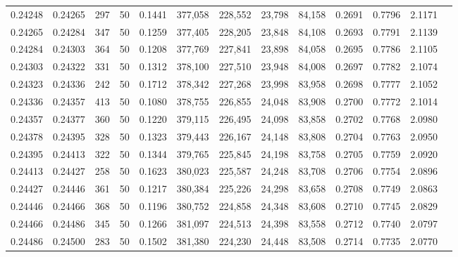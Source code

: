 \begin{tabular}{rrrrrrrrrrrrr}
0.24248 & 0.24265 &   297 &  50 &                                     0.1441 & 377,058 & 228,552 &  23,798 &  84,158 & 0.2691 & 0.7796 & 2.1171 \\
0.24265 & 0.24284 &   347 &  50 &                                     0.1259 & 377,405 & 228,205 &  23,848 &  84,108 & 0.2693 & 0.7791 & 2.1139 \\
0.24284 & 0.24303 &   364 &  50 &                                     0.1208 & 377,769 & 227,841 &  23,898 &  84,058 & 0.2695 & 0.7786 & 2.1105 \\
0.24303 & 0.24322 &   331 &  50 &                                     0.1312 & 378,100 & 227,510 &  23,948 &  84,008 & 0.2697 & 0.7782 & 2.1074 \\
0.24323 & 0.24336 &   242 &  50 &                                     0.1712 & 378,342 & 227,268 &  23,998 &  83,958 & 0.2698 & 0.7777 & 2.1052 \\
0.24336 & 0.24357 &   413 &  50 &                                     0.1080 & 378,755 & 226,855 &  24,048 &  83,908 & 0.2700 & 0.7772 & 2.1014 \\
0.24357 & 0.24377 &   360 &  50 &                                     0.1220 & 379,115 & 226,495 &  24,098 &  83,858 & 0.2702 & 0.7768 & 2.0980 \\
0.24378 & 0.24395 &   328 &  50 &                                     0.1323 & 379,443 & 226,167 &  24,148 &  83,808 & 0.2704 & 0.7763 & 2.0950 \\
0.24395 & 0.24413 &   322 &  50 &                                     0.1344 & 379,765 & 225,845 &  24,198 &  83,758 & 0.2705 & 0.7759 & 2.0920 \\
0.24413 & 0.24427 &   258 &  50 &                                     0.1623 & 380,023 & 225,587 &  24,248 &  83,708 & 0.2706 & 0.7754 & 2.0896 \\
0.24427 & 0.24446 &   361 &  50 &                                     0.1217 & 380,384 & 225,226 &  24,298 &  83,658 & 0.2708 & 0.7749 & 2.0863 \\
0.24446 & 0.24466 &   368 &  50 &                                     0.1196 & 380,752 & 224,858 &  24,348 &  83,608 & 0.2710 & 0.7745 & 2.0829 \\
0.24466 & 0.24486 &   345 &  50 &                                     0.1266 & 381,097 & 224,513 &  24,398 &  83,558 & 0.2712 & 0.7740 & 2.0797 \\
0.24486 & 0.24500 &   283 &  50 &                                     0.1502 & 381,380 & 224,230 &  24,448 &  83,508 & 0.2714 & 0.7735 & 2.0770 \\

\end{tabular}
